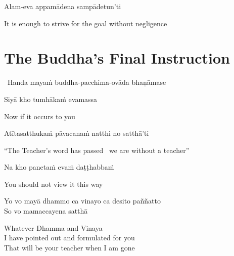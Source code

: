 Alam-eva appamādena sampādetun'ti\makeatletter\hyperlink{endnote93-appendix}\makeatother

\begin{english}
  It is enough to strive for the goal without negligence
\end{english}

\suttaRef{[SN 12.22]}


\section{The Buddha's Final Instruction}
\label{buddhas-final-instruction}

\begin{leader}
  \anglebracketleft\ \hspace{-0.5mm}Handa mayaṁ buddha-pacchima-ovāda bhaṇāmase \hspace{-0.5mm}\anglebracketright\
\end{leader}

Siyā kho tumhākaṁ evamassa

\begin{english}
  Now if it occurs to you
\end{english}

Atītasatthukaṁ pāvacanaṁ natthi no satthā'ti

\begin{english}
  ``The Teacher's word has passed \breathmark\ we are without a teacher''
\end{english}

Na kho panetaṁ evaṁ daṭṭhabbaṁ

\begin{english}
  You should not view it this way
\end{english}

Yo vo mayā dhammo ca vinayo ca desito paññatto\\
So vo mamaccayena satthā

\begin{english-verses}
  Whatever Dhamma and Vinaya\\
  I have pointed out and formulated for you\\
  That will be your teacher when I am gone
\end{english-verses}

